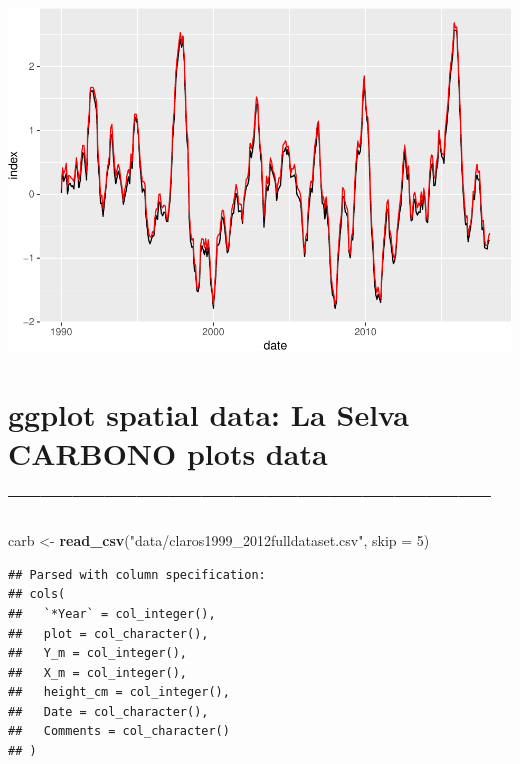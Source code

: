 \documentclass[]{article}
\newenvironment{Shaded}{\begin{snugshade}}{\end{snugshade}}
\newcommand{\DataTypeTok}[1]{\textcolor[rgb]{0.13,0.29,0.53}{#1}}
\newcommand{\DecValTok}[1]{\textcolor[rgb]{0.00,0.00,0.81}{#1}}
\newcommand{\KeywordTok}[1]{\textcolor[rgb]{0.13,0.29,0.53}{\textbf{#1}}}
\newcommand{\NormalTok}[1]{#1}
\newcommand{\OperatorTok}[1]{\textcolor[rgb]{0.81,0.36,0.00}{\textbf{#1}}}
\newcommand{\StringTok}[1]{\textcolor[rgb]{0.31,0.60,0.02}{#1}}
\begin{document}
\includegraphics{R_tidyverse_for_geographers_files/figure-latex/unnamed-chunk-17-1.pdf}

\hypertarget{ggplot-spatial-data-la-selva-carbono-plots-data}{%
\section{ggplot spatial data: La Selva CARBONO plots data
---------------------------------------------}\label{ggplot-spatial-data-la-selva-carbono-plots-data}}

\begin{Shaded}
\begin{Highlighting}[]
\NormalTok{carb <-}\StringTok{ }\KeywordTok{read_csv}\NormalTok{(}\StringTok{"data/claros1999_2012fulldataset.csv"}\NormalTok{, }\DataTypeTok{skip =} \DecValTok{5}\NormalTok{)}
\end{Highlighting}
\end{Shaded}

\begin{verbatim}
## Parsed with column specification:
## cols(
##   `*Year` = col_integer(),
##   plot = col_character(),
##   Y_m = col_integer(),
##   X_m = col_integer(),
##   height_cm = col_integer(),
##   Date = col_character(),
##   Comments = col_character()
## )
\end{verbatim}

\begin{Shaded}
\end{Shaded}
\end{document}
